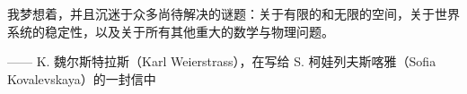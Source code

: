 
{\kaishu 我梦想着，并且沉迷于众多尚待解决的谜题：关于有限的和无限的空间，关于世界系统的稳定性，以及关于所有其他重大的数学与物理问题。}
\begin{flushright}
    \kaishu
    —— K. 魏尔斯特拉斯（Karl Weierstrass），在写给 S. 柯娃列夫斯喀雅（Sofia Kovalevskaya）的一封信中
\end{flushright}
